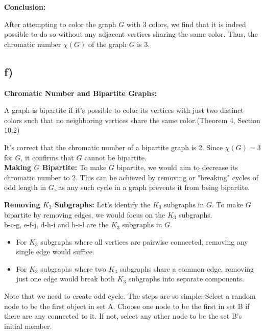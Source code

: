 \documentclass[12pt]{article}
\begin{document}
\textbf{Conclusion:}

After attempting to color the graph \( G \) with 3 colors, we find that it is indeed possible to do so without any adjacent vertices sharing the same color. Thus, the chromatic number \( \chi(G) \) of the graph \( G \) is 3.


\subsection*{f)}

\textbf{Chromatic Number and Bipartite Graphs:} 


A graph is bipartite if it's possible to color its vertices with just two distinct colors such that no neighboring vertices share the same color.(Theorem 4, Section 10.2)

It's correct that the chromatic number of a bipartite graph is 2. Since \( \chi(G) = 3 \) for \( G \), it confirms that \( G \) cannot be bipartite.\\

\textbf{Making \( G \) Bipartite:} To make \( G \) bipartite, we would aim to decrease its chromatic number to 2. This can be achieved by removing or "breaking" cycles of odd length in \( G \), as any such cycle in a graph prevents it from being bipartite.

\textbf{Removing \( K_3 \) Subgraphs:} Let's identify the \( K_3 \) subgraphs in \( G \). To make \( G \) bipartite by removing edges, we would focus on the \( K_3 \) subgraphs.\\

b-c-g, e-f-j, d-h-i and h-i-l are the \( K_3 \) subgraphs in \( G \).

\begin{itemize}
    \item For \( K_3 \) subgraphs where all vertices are pairwise connected, removing any single edge would suffice.
    
    \item For \( K_3 \) subgraphs where two \( K_3 \) subgraphs share a common edge, removing just one edge would break both \( K_3 \) subgraphs into separate components.
\end{itemize}

Note that we need to create odd cycle.
The steps are so simple:
Select a random node to be the first object in set A. Choose one node to be the first in set B if there are any connected to it. If not, select any other node to be the set B's initial member.
\end{document}
